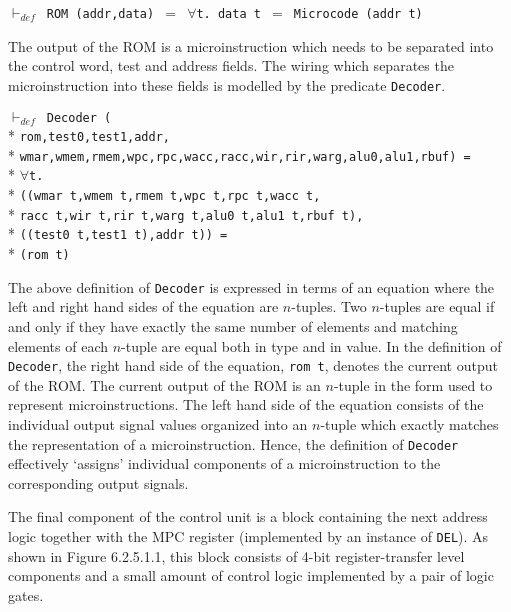 \begin{normalsize}
$\vdash_{def}$\verb" ROM (addr,data) "$=$\verb" "$\forall$\verb"t. data t "$=$\verb" Microcode (addr t)"

The output of the ROM is a microinstruction which needs to be separated
into the control word, test and address fields.
The wiring which separates the microinstruction into these
fields is modelled by the predicate \verb"Decoder".

\hspace*{\fill}
\begin{minipage}{17cm}
$\vdash_{def}$\verb" Decoder ("\\*
\verb"rom,test0,test1,addr,"\\*
\verb"wmar,wmem,rmem,wpc,rpc,wacc,racc,wir,rir,warg,alu0,alu1,rbuf) ="\\*
$\forall$\verb"t."\\*
\verb"((wmar t,wmem t,rmem t,wpc t,rpc t,wacc t,"\\*
\verb"racc t,wir t,rir t,warg t,alu0 t,alu1 t,rbuf t),"\\*
\verb"((test0 t,test1 t),addr t)) ="\\*
\verb"(rom t)"
\end{minipage}
\hspace*{\fill}

The above definition of \verb"Decoder" is expressed in terms
of an equation where the left and right hand sides of the equation
are $n$-tuples.
Two $n$-tuples are equal if and only if they have exactly the
same number of elements and matching elements of each $n$-tuple
are equal both in type and in value.
In the definition of \verb"Decoder",
the right hand side of the equation, \mbox{\verb"rom t"}, denotes
the current output of the ROM.
The current output of the ROM is an $n$-tuple in the form
used to represent microinstructions.
The left hand side of the equation
consists of the individual output signal values organized into
an $n$-tuple which exactly matches the representation
of a microinstruction.
Hence, the definition of \verb"Decoder" effectively `assigns'
individual components of a microinstruction to the corresponding
output signals.

The final component of the control unit is a block containing
the next address logic together with the MPC register
(implemented by an instance of \verb"DEL").
As shown in Figure 6.2.5.1.1,
this block consists of 4-bit register-transfer level components and
a small amount of control logic implemented by a pair of logic gates.


\end{normalsize}
